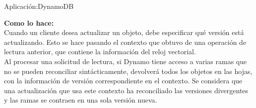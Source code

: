 \begin{frame}[fragile]{Aplicación:}{DynamoDB}
    \justifying

    {\bf Como lo hace:}\\[0.3cm]

    Cuando un cliente desea actualizar un objeto, debe especificar qué versión está
    actualizando. Esto se hace pasando el contexto que obtuvo de una operación de
    lectura anterior, que contiene la información del reloj vectorial.\\[0.3cm]

    Al procesar una solicitud de lectura, si Dynamo tiene acceso a varias ramas que
    no se pueden reconciliar sintácticamente, devolverá todos los objetos en las
    hojas, con la información de versión correspondiente en el contexto. Se considera
    que una actualización que usa este contexto ha reconciliado las versiones
    divergentes y las ramas se contraen en una sola versión nueva.

\end{frame}
